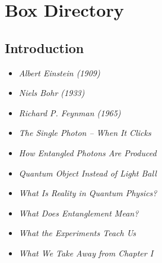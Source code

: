 \cleardoublepage
\renewcommand{\thechapter}{B}
\renewcommand{\thesection}{\Alph{chapter}.\arabic{section}}
\chapter{Box Directory}
\label{anhangB}
\label{chap:boxenverzeichnis}
\thispagestyle{empty}


\section{Introduction}
\vspace{1em}
\begin{tcolorbox}[title=Physics Boxes, physikbox]
	\begin{itemize}
		\item \emph{Albert Einstein (1909)}\dotfill \pageref{box:einstein1909}
		\item \emph{Niels Bohr (1933)}\dotfill  \pageref{box:bohr1933}
		\item \emph{Richard P. Feynman (1965)}\dotfill \pageref{box:feynman1965}
		\item \emph{The Single Photon – When It Clicks}\dotfill\pageref{box:einzelphoton}
		\item \emph{How Entangled Photons Are Produced}\dotfill \pageref{box:spdc}
	\end{itemize}
\end{tcolorbox}

\vspace{1em}
\begin{tcolorbox}[title=Didactics Boxes, didaktikbox]
	\begin{itemize}
		\item \emph{Quantum Object Instead of Light Ball} \dotfill\pageref{box:lichtkugel}
		\item \emph{What Is Reality in Quantum Physics?} \dotfill\pageref{box:realitaet}
		\item \emph{What Does Entanglement Mean?} \dotfill\pageref{box:verschr}
		\item \emph{What the Experiments Teach Us} \dotfill\pageref{box:experimente}
		\item \emph{What We Take Away from Chapter I} \dotfill\pageref{box:kapitel1faz}
	\end{itemize}
\end{tcolorbox}

